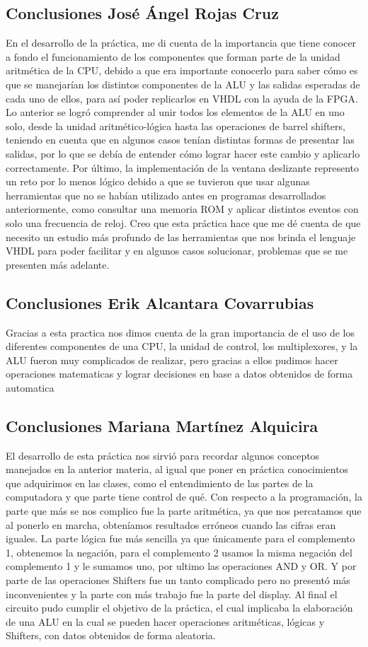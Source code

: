 	\subsection{Conclusiones Jos\'e \'Angel Rojas Cruz}
	En el desarrollo de la pr\'actica, me di cuenta de la importancia que tiene conocer a fondo el funcionamiento de los componentes que forman parte de la unidad aritm\'etica de la CPU, debido a que era importante conocerlo para saber c\'omo es que se manejar\'ian los distintos componentes de la ALU y las salidas esperadas de cada uno de ellos, para as\'i poder replicarlos en VHDL con la ayuda de la FPGA. Lo anterior se logr\'o comprender al unir todos los elementos de la ALU en uno solo, desde la unidad aritm\'etico-l\'ogica hasta las operaciones de barrel shifters, teniendo en cuenta que en algunos casos ten\'ian distintas formas de presentar las salidas, por lo que se deb\'ia de entender c\'omo lograr hacer este cambio y aplicarlo correctamente. Por \'ultimo, la implementaci\'on de la ventana deslizante represento un reto por lo menos l\'ogico debido a que se tuvieron que usar algunas herramientas que no se hab\'ian utilizado antes en programas desarrollados anteriormente, como consultar una memoria ROM y aplicar distintos eventos con solo una frecuencia de reloj. Creo que esta pr\'actica hace que me d\'e cuenta de que necesito un estudio m\'as profundo de las herramientas que nos brinda el lenguaje VHDL para poder facilitar y en algunos casos solucionar, problemas que se me presenten m\'as adelante.
	\subsection{Conclusiones Erik Alcantara Covarrubias }
Gracias a esta practica nos dimos cuenta de la gran importancia de el uso de los diferentes componentes de una CPU, la unidad de control, los multiplexores, y la ALU fueron muy complicados de realizar, pero gracias a ellos pudimos hacer operaciones matematicas y lograr decisiones en base a datos obtenidos de forma automatica
	\subsection{Conclusiones Mariana Mart\'inez Alquicira}
	El desarrollo de esta pr\'actica nos sirvi\'o para recordar algunos conceptos manejados en la anterior materia, al igual que poner en pr\'actica conocimientos que adquirimos en las clases, como el entendimiento de las partes de la computadora y que parte tiene control de qu\'e.
Con respecto a la programaci\'on, la parte que m\'as se nos complico fue la parte aritm\'etica, ya que nos percatamos que al ponerlo en marcha, obten\'iamos resultados err\'oneos cuando las cifras eran iguales. La parte l\'ogica fue m\'as sencilla ya que \'unicamente para el complemento 1, obtenemos la negaci\'on, para el complemento 2 usamos la misma negaci\'on del complemento 1 y le sumamos uno, por ultimo las operaciones AND y OR. Y por parte de las operaciones Shifters fue un tanto complicado pero no present\'o m\'as inconvenientes y la parte con m\'as trabajo fue la parte del display.
Al final el circuito pudo cumplir el objetivo de la pr\'actica, el cual implicaba la elaboraci\'on de una ALU en la cual se pueden hacer operaciones aritm\'eticas, l\'ogicas y Shifters, con datos obtenidos de forma aleatoria.